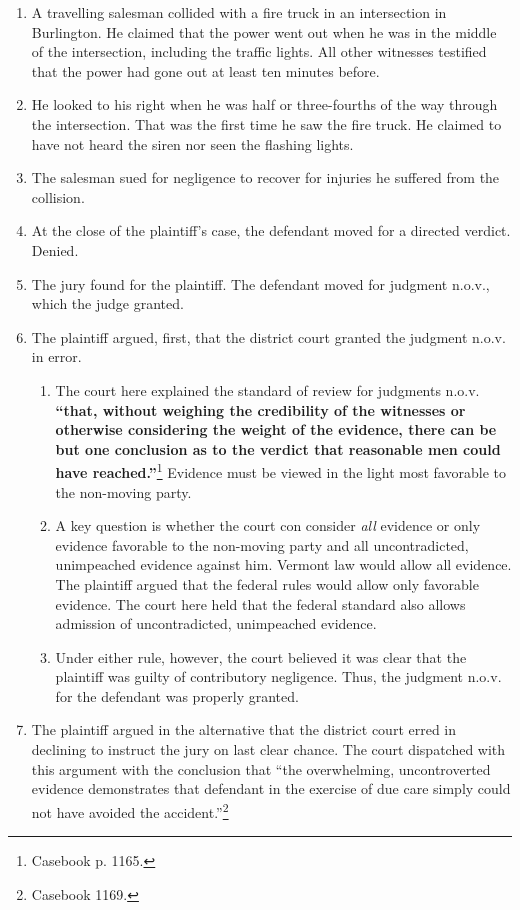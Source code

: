 \begin{enumerate}
    \item A travelling salesman collided with a fire truck in an intersection in Burlington. He claimed that the power went out when he was in the middle of the intersection, including the traffic lights. All other witnesses testified that the power had gone out at least ten minutes before.
    \item He looked to his right when he was half or three-fourths of the way through the intersection. That was the first time he saw the fire truck. He claimed to have not heard the siren nor seen the flashing lights.
    \item The salesman sued for negligence to recover for injuries he suffered from the collision.
    \item At the close of the plaintiff's case, the defendant moved for a directed verdict. Denied.
    \item The jury found for the plaintiff. The defendant moved for judgment n.o.v., which the judge granted.
    \item The plaintiff argued, first, that the district court granted the judgment n.o.v. in error.
    \begin{enumerate}
        \item The court here explained the standard of review for judgments n.o.v. \textbf{``that, without weighing the credibility of the witnesses or otherwise considering the weight of the evidence, there can be but one conclusion as to the verdict that reasonable men could have reached.''}\footnote{Casebook p. 1165.} Evidence must be viewed in the light most favorable to the non-moving party.
        \item A key question is whether the court con consider \emph{all} evidence or only evidence favorable to the non-moving party and all uncontradicted, unimpeached evidence against him. Vermont law would allow all evidence. The plaintiff argued that the federal rules would allow only favorable evidence. The court here held that the federal standard also allows admission of uncontradicted, unimpeached evidence.
        \item Under either rule, however, the court believed it was clear that the plaintiff was guilty of contributory negligence. Thus, the judgment n.o.v. for the defendant was properly granted.
    \end{enumerate}
    \item The plaintiff argued in the alternative that the district court erred in declining to instruct the jury on last clear chance. The court dispatched with this argument with the conclusion that ``the overwhelming, uncontroverted evidence demonstrates that defendant in the exercise of due care simply could not have avoided the accident.''\footnote{Casebook 1169.}

\end{enumerate}
